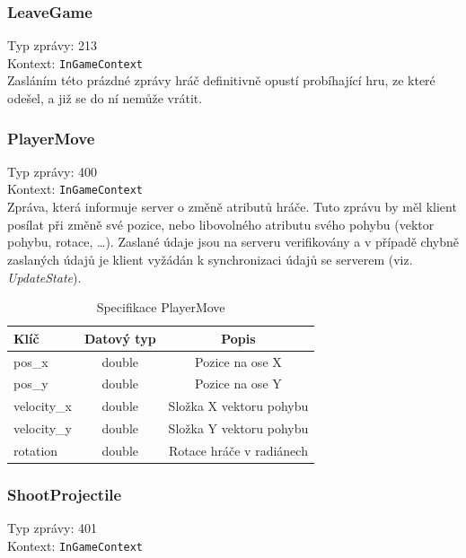 \documentclass[12pt, a4paper]{article}
\begin{document}
    \subsubsection*{LeaveGame}
    Typ zprávy: 213\\
    Kontext: \texttt{InGameContext}\\

    Zasláním této prázdné zprávy hráč definitivně opustí probíhající hru, ze které odešel, a již se do ní nemůže vrátit.
   
    \subsubsection*{PlayerMove}
    Typ zprávy: 400\\
    Kontext: \texttt{InGameContext}\\

    Zpráva, která informuje server o změně atributů hráče.
    Tuto zprávu by měl klient posílat při změně své pozice, nebo libovolného atributu svého pohybu (vektor pohybu, rotace, \dots).
    Zaslané údaje jsou na serveru verifikovány a v případě chybně zaslaných údajů je klient vyžádán k synchronizaci údajů se serverem (viz. \textit{UpdateState}).

    \begin{table}[H]
        \centering
        \begin{tabular}{|l|c|c|}
            \hline
            Klíč & Datový typ & Popis\\
            \hline
            \hline
            pos\_x & double & Pozice na ose X\\
            \hline
            pos\_y & double & Pozice na ose Y\\
            \hline
            velocity\_x & double & Složka X vektoru pohybu\\
            \hline
            velocity\_y & double & Složka Y vektoru pohybu\\
            \hline
            rotation & double & Rotace hráče v radiánech\\
            \hline
        \end{tabular}
        \caption{Specifikace PlayerMove}
    \end{table}

    \subsubsection*{ShootProjectile}
    Typ zprávy: 401\\
    Kontext: \texttt{InGameContext}\\
\end{document}

